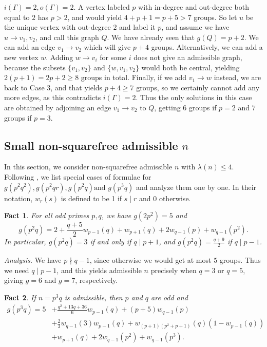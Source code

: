 \documentclass{article}
\theoremstyle{plain}
\newtheorem{eufact}{Fact}[section]
\theoremstyle{definition}
\begin{document}
 $i(\Gamma) = 2, o(\Gamma) = 2$. A vertex labeled $p$ with in-degree and out-degree both equal to $2$ has $p > 2$, and would yield $4 + p + 1 = p + 5 > 7$ groups. So let $u$ be the unique vertex with out-degree $2$ and label it $p$, and assume we have $u \rightarrow v_1, v_2$, and call this graph $Q$. We have already seen that $g(Q) = p + 2$.
We can add an edge $v_1 \rightarrow v_2$ which will give $p + 4$ groups. Alternatively, we can add a new vertex $w$. Adding $w \rightarrow v_i$ for some $i$ does not give an admissible graph, because the subsets $\{v_1, v_2\}$ and $\{w, v_1, v_2\}$ would both be central, yielding $2(p + 1) = 2p + 2 \ge 8$ groups in total. Finally, if we add $v_1 \rightarrow w$ instead, we are back to Case $3$, and that yields $p + 4 \ge 7$ groups, so we certainly cannot add any more edges, as this contradicts $i(\Gamma) = 2$. Thus the only solutions in this case are obtained by adjoining an edge $v_1 \rightarrow v_2$ to $Q$, getting $6$ groups if $p = 2$ and $7$ groups if $p = 3$.

\subsection{Small non-squarefree admissible $n$}
In this section, we consider non-squarefree admissible $n$ with $\lambda(n) \le 4$. Following {\cite{bettinafour1}}, we list special cases of formulae for $g(p^2 q^2), g(p^2 q r), g(p^2 q) \text{and } g(p^3 q)$ and analyze them one by one. In their notation, $w_r(s)$ is defined to be 1 if $s \mid r$ and 0 otherwise. 

\begin{eufact}
	For all odd primes $p, q$, we have $g(2p^2) = 5$ and \[g(p^2 q) = 2 + \frac{q + 5}{2} w_{p - 1}(q) + w_{p + 1}(q) + 2w_{q - 1}(p) + w_{q - 1}(p^2).\] In particular, $g(p^2 q) = 3$ if and only if $q \mid p + 1$, and $g(p^2 q) = \frac{q + 9}{2}$ if $q \mid p - 1$.
\end{eufact}

\textit{Analysis.} We have $p \nmid q - 1$, since otherwise we would get at most $5$ groups. Thus we need $q \mid p - 1$, and this yields admissible $n$ precisely when $q = 3$ or $q = 5$, giving $g = 6$ and $g = 7$, respectively.

\begin{eufact}
	If $n = p^3 q$ is admissible, then $p$ and $q$ are odd and
	$$\begin{aligned}
		g(p^3 q) = 5 &+ \frac{q^2 + 13q + 36}{6} w_{p - 1}(q) + (p + 5) w_{q - 1}(p) \\
		&+ \frac{2}{3} w_{q - 1}(3)w_{p - 1}(q) + w_{(p + 1)(p^2 + p + 1)}(q) (1 - w_{p - 1}(q)) \\
		&+ w_{p + 1}(q) + 2 w_{q - 1}(p^2) + w_{q - 1}(p^3).
	\end{aligned}$$
\end{eufact}
\end{document}
